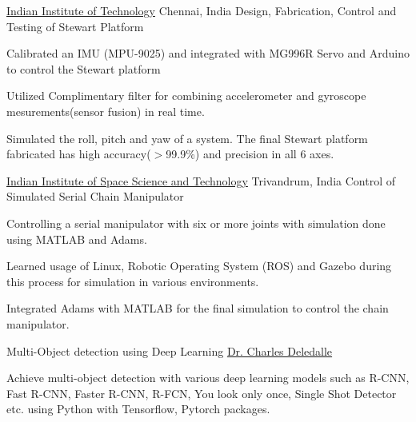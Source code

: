\documentclass[10pt]{article}
\begin{document}
\headedsection
{\href{https://www.linedata.com/}{Indian Institute of Technology}}
{Chennai, India}
{Design, Fabrication, Control and Testing of Stewart Platform}
{}
{\vspace{-2.4ex}
	\begin{circlist}
		\item Calibrated an IMU (MPU-9025) and integrated with MG996R Servo and Arduino to control the Stewart platform 
		\item Utilized Complimentary filter for combining accelerometer and gyroscope mesurements(sensor fusion) in real time. 
		\item Simulated the roll, pitch and yaw of a system. The final Stewart platform fabricated has high accuracy($>$99.9\%) and \newline precision in all 6 axes.
	\end{circlist}
}

\headedsection
{\href{https://www.iist.ac.in/}{Indian Institute of Space Science and Technology}}
{Trivandrum, India}
{Control of Simulated Serial Chain Manipulator}
{}
{\vspace{-2.4ex}
	\begin{circlist}
		\item  Controlling a serial manipulator with six or more joints with simulation done using MATLAB and Adams. 
		\item Learned usage of Linux, Robotic Operating System (ROS) and Gazebo during this process for simulation in various environments. 
		\item Integrated Adams with MATLAB for the final simulation to control the chain manipulator.
	\end{circlist}
}

\spacedhrule{0.8ex}{0.0ex}

\headedsectiontwo
{Multi-Object detection using Deep Learning}{}
{\href{https://www.charles-deledalle.fr/pages/}{Dr. Charles Deledalle}}
{\vspace{-2.4ex}
    \begin{circlist}
        \item Achieve multi-object detection with various deep learning models such as R-CNN, Fast R-CNN, Faster R-CNN, R-FCN, You look only once, Single Shot Detector etc. using Python with Tensorflow, Pytorch packages.
    \end{circlist}
}
\end{document}
